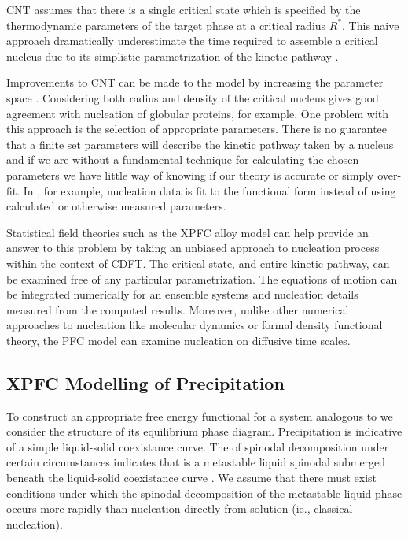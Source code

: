 CNT assumes that there is a single critical state which is specified by the
thermodynamic parameters of the target phase at a critical radius $R^*$. This
naive approach dramatically underestimate the time required to assemble a
critical nucleus due to its simplistic parametrization of the kinetic pathway
\cite{LUTSKO15, MYERSON04, MYERSON09}.

Improvements to CNT can be made to the model by increasing the parameter space .
Considering both radius and density of the critical nucleus \cite{LUTSKO15} gives good agreement with
nucleation of globular proteins, for example. One problem with this approach is
the selection of appropriate parameters. There is no guarantee that a finite
set parameters will describe the kinetic pathway taken by a nucleus and if we
are without a fundamental technique for calculating the chosen parameters we
have little way of knowing if our theory is accurate or simply over-fit. In
\cite{MYERSON09}, for example, nucleation data is fit to the functional form
instead of using calculated or otherwise measured parameters.


Statistical field theories such as the XPFC alloy model can help provide an answer to this
problem by taking an unbiased approach to nucleation process within the context of CDFT. 
The critical state, and entire kinetic pathway, can be examined free of any particular 
parametrization. The equations of motion can be integrated numerically for an 
ensemble systems and nucleation details measured from the computed results. 
Moreover, unlike other numerical approaches to nucleation like molecular dynamics 
or formal density functional theory, the PFC model can examine nucleation on 
diffusive time scales.

\subsection{XPFC Modelling of Precipitation} %


To construct an appropriate free energy functional for a system analogous to 
 we consider
the structure of its equilibrium phase diagram. Precipitation is indicative of
a simple liquid-solid coexistance curve. The  of spinodal decomposition
under certain circumstances indicates that is a metastable liquid spinodal
submerged beneath the liquid-solid coexistance curve \cite{DAVEY13}. We assume
that there must exist conditions under which the spinodal decomposition of the
metastable liquid phase occurs more rapidly than nucleation directly from
solution (ie., classical nucleation).

